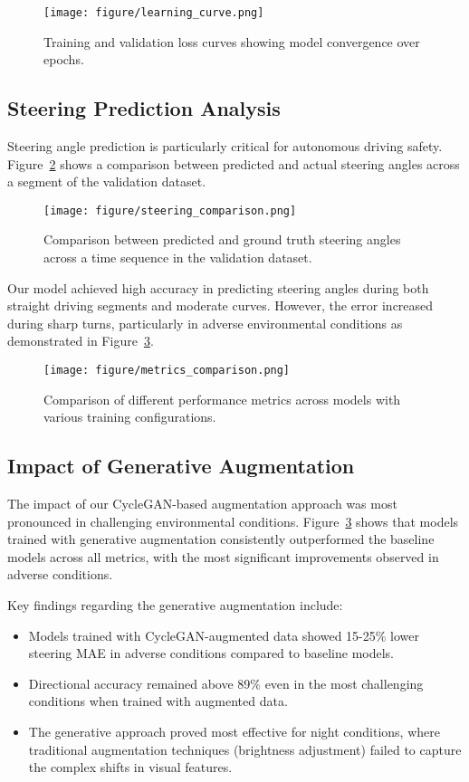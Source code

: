 \documentclass[pdflatex,sn-mathphys-num]{sn-jnl}%
\theoremstyle{thmstyleone}%
\theoremstyle{thmstyletwo}%
\theoremstyle{thmstylethree}%
\begin{document}
\begin{figure}[h]
\centering
\texttt{[image: figure/learning\_curve.png]}
\caption{Training and validation loss curves showing model convergence over epochs.}\label{fig3}
\end{figure}

\subsection{Steering Prediction Analysis}
Steering angle prediction is particularly critical for autonomous driving safety. Figure~\ref{fig4} shows a comparison between predicted and actual steering angles across a segment of the validation dataset.

\begin{figure}[h]
\centering
\texttt{[image: figure/steering\_comparison.png]}
\caption{Comparison between predicted and ground truth steering angles across a time sequence in the validation dataset.}\label{fig4}
\end{figure}

Our model achieved high accuracy in predicting steering angles during both straight driving segments and moderate curves. However, the error increased during sharp turns, particularly in adverse environmental conditions as demonstrated in Figure~\ref{fig5}.

\begin{figure}[h]
\centering
\texttt{[image: figure/metrics\_comparison.png]}
\caption{Comparison of different performance metrics across models with various training configurations.}\label{fig5}
\end{figure}

\subsection{Impact of Generative Augmentation}
The impact of our CycleGAN-based augmentation approach was most pronounced in challenging environmental conditions. Figure~\ref{fig5} shows that models trained with generative augmentation consistently outperformed the baseline models across all metrics, with the most significant improvements observed in adverse conditions.

Key findings regarding the generative augmentation include:

\begin{itemize}
\item Models trained with CycleGAN-augmented data showed 15-25\% lower steering MAE in adverse conditions compared to baseline models.
\item Directional accuracy remained above 89\% even in the most challenging conditions when trained with augmented data.
\item The generative approach proved most effective for night conditions, where traditional augmentation techniques (brightness adjustment) failed to capture the complex shifts in visual features.
\end{itemize}
\end{document}

